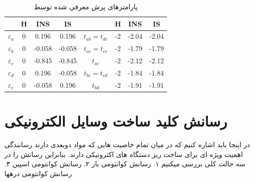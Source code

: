 \begin{table}
  \centering
  \caption{پارامترهای پرش  معرفی شده توسط \cite{ezawaTripletFermionsDirac2017}\label{tbl:hoppingtable}}
  \begin{tabular}{cccccccc}
  \toprule
   & H & INS & IS &
   & H & INS & IS\\
  \midrule
  $\varepsilon_a$& 0 &  0.196 &  0.196 & $t_{ab}=t_{de}$& -2 & -2.04 & -2.04 \\
  $\varepsilon_b$& 0 & -0.058 & -0.058 & $t_{ac}=t_{ce}$& -2 & -1.79 & -1.79 \\
  $\varepsilon_c$& 0 & -0.845 & -0.845 & $t_{ae}$& -2 & -2.12 & -2.12   \\
  $\varepsilon_d$& 0 &  0.196 & -0.058 & $t_{bc}=t_{cd}$& -2 & -1.84 & -1.84 \\
  $\varepsilon_e$& 0 & -0.058 &  0.196 & $t_{bd}$& -2 & -1.91 & -1.91  \\
  \bottomrule
  \end{tabular}
  \end{table}
\section{رسانش کلید ساخت وسایل الکترونیکی}
در اینجا باید اشاره کنیم که در میان تمام خاصیت هایی که مواد دوبعدی دارند رسانندگی اهمیت ویژه ای برای ساخت ریز دستگاه های اکترونیکی دارند. بنابراین رسانش را در سه حالت کلی بررسی میکنیم
۱. رسانش کوانتومی بار
۲. رسانش کوانتومی اسپین
۳. رسانش کوانتومی درهها

